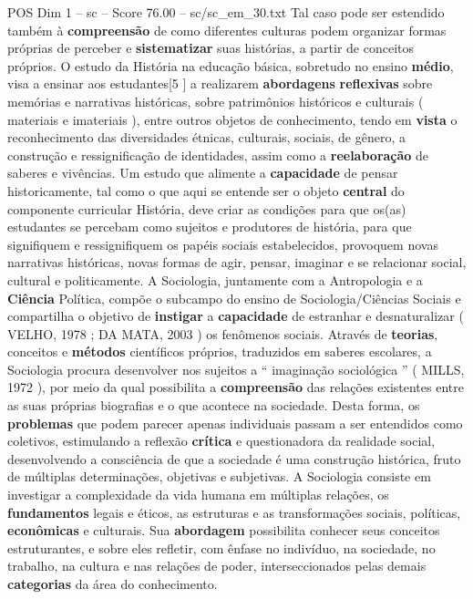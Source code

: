 \begin{textsample}{POS Dim 1 – sc – Score 76.00 – sc/sc\_em\_30.txt}
Tal caso pode ser estendido também à \textbf{compreensão} de como diferentes culturas podem organizar formas próprias de perceber e \textbf{sistematizar} suas histórias, a partir de conceitos próprios.
O estudo da História na educação básica, sobretudo no ensino \textbf{médio}, visa a ensinar aos estudantes[5 ] a realizarem \textbf{abordagens} \textbf{reflexivas} sobre memórias e narrativas históricas, sobre patrimônios históricos e culturais ( materiais e imateriais ), entre outros objetos de conhecimento, tendo em \textbf{vista} o reconhecimento das diversidades étnicas, culturais, sociais, de gênero, a construção e ressignificação de identidades, assim como a \textbf{reelaboração} de saberes e vivências.
Um estudo que alimente a \textbf{capacidade} de pensar historicamente, tal como o que aqui se entende ser o objeto \textbf{central} do componente curricular História, deve criar as condições para que os(as) estudantes se percebam como sujeitos e produtores de história, para que signifiquem e ressignifiquem os papéis sociais estabelecidos, provoquem novas narrativas históricas, novas formas de agir, pensar, imaginar e se relacionar social, cultural e politicamente.
A Sociologia, juntamente com a Antropologia e a \textbf{Ciência} Política, compõe o subcampo do ensino de Sociologia/Ciências Sociais e compartilha o objetivo de \textbf{instigar} a \textbf{capacidade} de estranhar e desnaturalizar ( VELHO, 1978 ; DA MATA, 2003 ) os fenômenos sociais.
Através de \textbf{teorias}, conceitos e \textbf{métodos} científicos próprios, traduzidos em saberes escolares, a Sociologia procura desenvolver nos sujeitos a “ imaginação sociológica ” ( MILLS, 1972 ), por meio da qual possibilita a \textbf{compreensão} das relações existentes entre as suas próprias biografias e o que acontece na sociedade.
Desta forma, os \textbf{problemas} que podem parecer apenas individuais passam a ser entendidos como coletivos, estimulando a reflexão \textbf{crítica} e questionadora da realidade social, desenvolvendo a consciência de que a sociedade é uma construção histórica, fruto de múltiplas determinações, objetivas e subjetivas.
A Sociologia consiste em investigar a complexidade da vida humana em múltiplas relações, os \textbf{fundamentos} legais e éticos, as estruturas e as transformações sociais, políticas, \textbf{econômicas} e culturais.
Sua \textbf{abordagem} possibilita conhecer seus conceitos estruturantes, e sobre eles refletir, com ênfase no indivíduo, na sociedade, no trabalho, na cultura e nas relações de poder, interseccionados pelas demais \textbf{categorias} da área do conhecimento.

\end{textsample}
